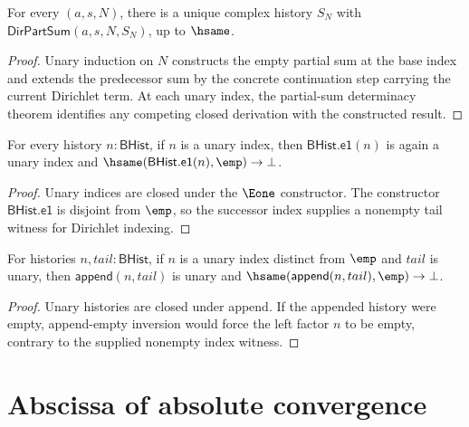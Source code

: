 \begin{lemma}
\label{lem:dir-part-sum-complex}
For every \((a, s, N)\), there is a unique complex history \(S_N\) with \(\mathsf{DirPartSum}(a, s, N, S_N)\), up to \(\hsame\).
\end{lemma}
\begin{proof}
Unary induction on \(N\) constructs the empty partial sum at the base index and
extends the predecessor sum by the concrete continuation step carrying the
current Dirichlet term. At each unary index, the partial-sum determinacy theorem
identifies any competing closed derivation with the constructed result.
\end{proof}

\begin{theorem}
\label{thm:dirichlet-series-index-e1-tail-nonempty}
For every history $n:\mathsf{BHist}$, if $n$ is a unary index, then
$\mathsf{BHist.e1}(n)$ is again a unary index and
$\hsame(\mathsf{BHist.e1}(n),\emp)\to\bot$.
\end{theorem}
\begin{proof}
Unary indices are closed under the $\Eone$ constructor. The constructor
$\mathsf{BHist.e1}$ is disjoint from $\emp$, so the successor index supplies a
nonempty tail witness for Dirichlet indexing.
\end{proof}

\begin{theorem}
\label{thm:dirichlet-series-index-append-unary-tail-nonempty}
For histories $n,tail:\mathsf{BHist}$, if $n$ is a unary index distinct from
$\emp$ and $tail$ is unary, then $\mathsf{append}(n,tail)$ is unary and
$\hsame(\mathsf{append}(n,tail),\emp)\to\bot$.
\end{theorem}
\begin{proof}
Unary histories are closed under append. If the appended history were empty,
append-empty inversion would force the left factor $n$ to be empty, contrary to
the supplied nonempty index witness.
\end{proof}

\section{Abscissa of absolute convergence}

